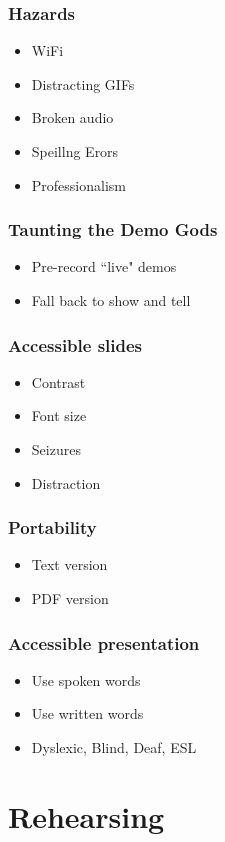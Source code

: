 \documentclass{beamer}
\begin{document}
\begin{frame}[fragile]
\frametitle{Hazards}
\begin{itemize}[<+(1)->]
\item WiFi
\item Distracting GIFs
\item Broken audio
\item Speillng Erors
\item Professionalism
\end{itemize}
\end{frame}

\begin{frame}[fragile]
\frametitle{Taunting the Demo Gods}
\begin{itemize}[<+(1)->]
\item Pre-record ``live" demos
\item Fall back to show and tell
\end{itemize}
\end{frame}

\begin{frame}[fragile]
\frametitle{Accessible slides}
\begin{itemize}[<+(1)->]
\item Contrast
\item Font size
\item Seizures
\item Distraction
\end{itemize}
\end{frame}

\begin{frame}[fragile]
\frametitle{Portability}
\begin{itemize}[<+(1)->]
\item Text version
\item PDF version
\end{itemize}
\end{frame}

\begin{frame}[fragile]
\frametitle{Accessible presentation}
\begin{itemize}[<+(1)->]
\item Use spoken words
\item Use written words
\item Dyslexic, Blind, Deaf, ESL
\end{itemize}
\end{frame}

\section{Rehearsing}
\end{document}
